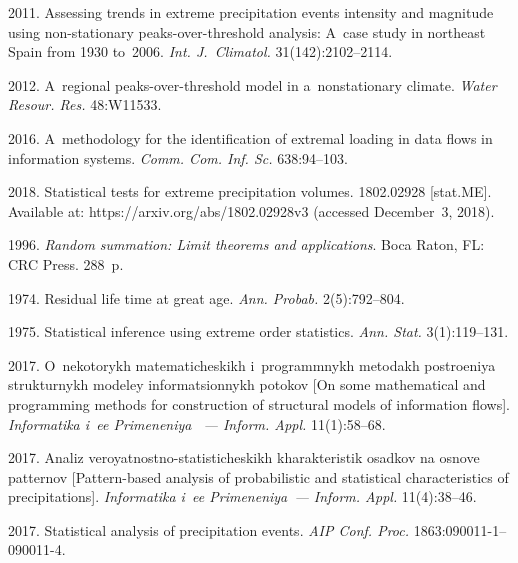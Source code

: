 \begin{multicols}{2}
{{\begin{thebibliography}{99}
 2011. Assessing trends 
in extreme precipitation events intensity and magnitude using non-stationary 
peaks-over-threshold analysis: A~case study in northeast Spain from 1930 to~2006. 
\textit{Int. J.~Climatol.} 31(142):2102--2114.

 2012. A~regional peaks-over-threshold model in a~nonstationary climate. 
 \textit{Water Resour. Res.} 48:W11533.

 2016. 
A~methodology for the identification of extremal loading in data flows in 
information systems. \textit{Comm. Com. Inf. Sc.} 638:94--103.

2018. Statistical tests for extreme precipitation volumes. 
1802.02928 [stat.ME]. Available at:
{\sf https://arxiv.org/\linebreak abs/1802.02928v3} (accessed December~3, 2018).

 1996. \textit{Random summation: Limit 
theorems and applications}. Boca Raton, FL: CRC Press. 288~p.

 1974. Residual life time at great age. 
\textit{Ann. Probab.} 2(5):792--804.

 1975. Statistical inference using extreme order statistics. 
\textit{Ann. Stat.} 3(1):119--131.

 2017. O~nekotorykh matematicheskikh i~programmnykh metodakh
postroeniya strukturnykh modeley informatsionnykh potokov [On some mathematical and
programming methods for construction of structural models of information flows]. 
\textit{Informatika i~ee Primeneniya ~--- Inform. Appl.} 11(1):58--68.

 2017. 
Analiz veroyatnostno-statisticheskikh kharakteristik osadkov 
na osnove patternov [Pattern-based analysis of probabilistic and 
statistical characteristics of precipitations]. 
\textit{Informatika i~ee Primeneniya~--- Inform. Appl.} 11(4):38--46.

2017. Statistical analysis of precipitation events. \textit{AIP Conf. Proc.} 
1863:\mbox{090011-1}--\mbox{090011-4}.


\end{thebibliography}}}
\end{multicols}
